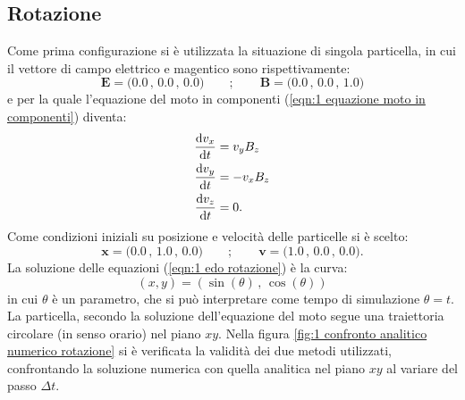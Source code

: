 \documentclass[10pt,a4paper]{article}
\begin{document}
\subsection{Rotazione\label{sctn:rotazione}}

Come prima configurazione si è utilizzata la situazione di singola particella, in cui il vettore di campo elettrico e magentico sono rispettivamente:
\begin{equation}
    \mathbf{E} = \big( 0.0\, , \, 0.0\, , \, 0.0 \big) \qquad ; \qquad \mathbf{B} = \big( 0.0\, , \, 0.0\, , \, 1.0 \big)
\end{equation}
e per la quale l'equazione del moto in componenti (\ref{eqn:1 equazione moto in componenti}) diventa:
\begin{align}
    \dv{v_{x}}{t} &= v_{y}B_{z} \notag \\
    \dv{v_{y}}{t} &= - v_{x}B_{z} \label{eqn:1 edo rotazione} \\
    \dv{v_{z}}{t} &= 0. \notag
\end{align}
Come condizioni iniziali su posizione e velocità delle particelle si è scelto:
\begin{equation}
    \mathbf{x} = \big( 0.0\, , \, 1.0\, , \, 0.0 \big) \qquad ; \qquad \mathbf{v} = \big( 1.0\, , \, 0.0\, , \, 0.0 \big).
\end{equation}
La soluzione delle equazioni (\ref{eqn:1 edo rotazione}) è la curva:
\begin{equation}
    (x,y) = (\sin{(\theta)}\, , \, \cos{(\theta)})
\end{equation}
in cui $\theta$ è un parametro, che si può interpretare come tempo di simulazione $\theta = t$. La particella, secondo la soluzione dell'equazione del moto segue una traiettoria circolare (in senso orario) nel piano $xy$. Nella figura \ref{fig:1 confronto analitico numerico rotazione} si è verificata la validità dei due metodi utilizzati, confrontando la soluzione numerica con quella analitica nel piano $xy$ al variare del passo $\Delta t$. 
\end{document}
